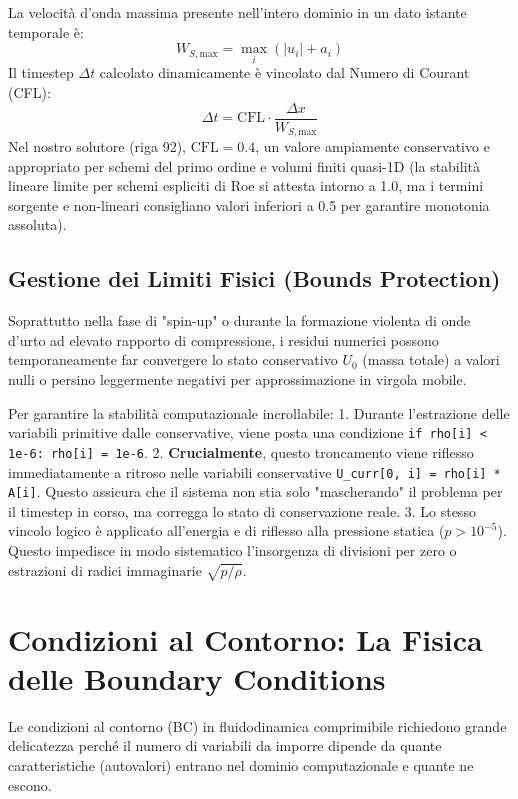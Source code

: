 \documentclass[11pt,a4paper]{article}
\begin{document}
La velocità d'onda massima presente nell'intero dominio in un dato istante temporale è:
\begin{equation}
W_{S, \text{max}} = \max_i \left( |u_i| + a_i \right)
\end{equation}
Il timestep $\Delta t$ calcolato dinamicamente è vincolato dal Numero di Courant (CFL):
\begin{equation}
\Delta t = \text{CFL} \cdot \frac{\Delta x}{W_{S, \text{max}}}
\end{equation}
Nel nostro solutore (riga 92), $\text{CFL} = 0.4$, un valore ampiamente conservativo e appropriato per schemi del primo ordine e volumi finiti quasi-1D (la stabilità lineare limite per schemi espliciti di Roe si attesta intorno a 1.0, ma i termini sorgente e non-lineari consigliano valori inferiori a 0.5 per garantire monotonia assoluta).

\subsection{Gestione dei Limiti Fisici (Bounds Protection)}
Soprattutto nella fase di "spin-up" o durante la formazione violenta di onde d'urto ad elevato rapporto di compressione, i residui numerici possono temporaneamente far convergere lo stato conservativo $U_0$ (massa totale) a valori nulli o persino leggermente negativi per approssimazione in virgola mobile.

Per garantire la stabilità computazionale incrollabile:
1. Durante l'estrazione delle variabili primitive dalle conservative, viene posta una condizione \texttt{if rho[i] < 1e-6: rho[i] = 1e-6}.
2. \textbf{Crucialmente}, questo troncamento viene riflesso immediatamente a ritroso nelle variabili conservative \texttt{U\_curr[0, i] = rho[i] * A[i]}. Questo assicura che il sistema non stia solo "mascherando" il problema per il timestep in corso, ma corregga lo stato di conservazione reale.
3. Lo stesso vincolo logico è applicato all'energia e di riflesso alla pressione statica ($p > 10^{-5}$). Questo impedisce in modo sistematico l'insorgenza di divisioni per zero o estrazioni di radici immaginarie $\sqrt{p/\rho}$.

\section{Condizioni al Contorno: La Fisica delle Boundary Conditions}

Le condizioni al contorno (BC) in fluidodinamica comprimibile richiedono grande delicatezza perché il numero di variabili da imporre dipende da quante caratteristiche (autovalori) entrano nel dominio computazionale e quante ne escono.
\end{document}
